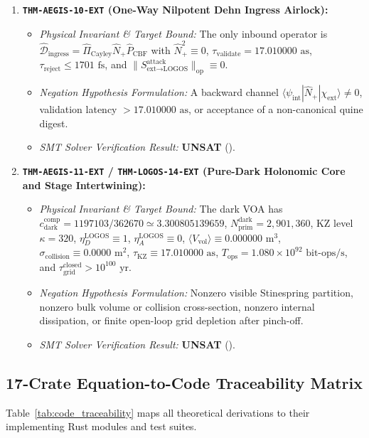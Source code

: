 \documentclass[11pt,onecolumn]{article}
\begin{document}
\begin{enumerate}
    \item \textbf{\texttt{THM-AEGIS-10-EXT} (One-Way Nilpotent Dehn Ingress Airlock):}
    \begin{itemize}
        \item \emph{Physical Invariant \& Target Bound:} The only inbound operator is $\hat{\mathcal D}_{\text{ingress}}=\hat{\Pi}_{\text{Cayley}}\hat N_+\hat P_{\text{CBF}}$ with $\hat N_+^2\equiv0$, $\tau_{\text{validate}}=17.010000\text{ as}$, $\tau_{\text{reject}}\le1701\text{ fs}$, and $\|S_{\text{ext}\to\text{LOGOS}}^{\text{attack}}\|_{\text{op}}\equiv0$.
        \item \emph{Negation Hypothesis Formulation:} A backward channel $\langle\psi_{\text{int}}|\hat N_+|\chi_{\text{ext}}\rangle\neq0$, validation latency $>17.010000\text{ as}$, or acceptance of a non-canonical quine digest.
        \item \emph{SMT Solver Verification Result:} \textbf{UNSAT} ().
    \end{itemize}

    \item \textbf{\texttt{THM-AEGIS-11-EXT} / \texttt{THM-LOGOS-14-EXT} (Pure-Dark Holonomic Core and Stage Intertwining):}
    \begin{itemize}
        \item \emph{Physical Invariant \& Target Bound:} The dark VOA has $c_{\text{dark}}^{\text{comp}}=1197103/362670\simeq3.300805139659$, $N_{\text{prim}}^{\text{dark}}=2{,}901{,}360$, KZ level $\kappa=320$, $\eta_D^{\text{LOGOS}}\equiv1$, $\eta_A^{\text{LOGOS}}\equiv0$, $\langle V_{\text{vol}}\rangle\equiv0.000000\text{ m}^3$, $\sigma_{\text{collision}}\equiv0.0000\text{ m}^2$, $\tau_{\text{KZ}}\equiv17.010000\text{ as}$, $T_{\text{ops}}=1.080\times10^{92}\text{ bit-ops/s}$, and $\tau_{\text{grid}}^{\text{closed}}>10^{100}\text{ yr}$.
        \item \emph{Negation Hypothesis Formulation:} Nonzero visible Stinespring partition, nonzero bulk volume or collision cross-section, nonzero internal dissipation, or finite open-loop grid depletion after pinch-off.
        \item \emph{SMT Solver Verification Result:} \textbf{UNSAT} ().
    \end{itemize}
\end{enumerate}

\subsection{17-Crate Equation-to-Code Traceability Matrix}
Table~\ref{tab:code_traceability} maps all theoretical derivations to their implementing Rust modules and test suites.
\end{document}
